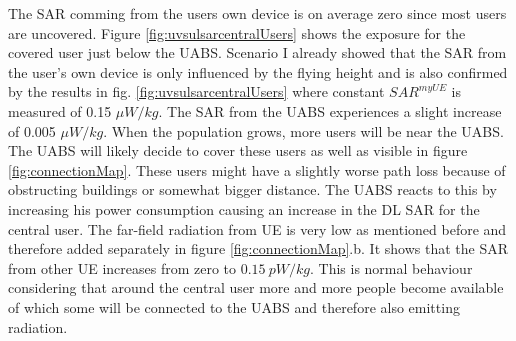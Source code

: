 \documentclass[twocolumn]{phdsymp} %
\begin{document}
The \gls{SAR} comming from the 
users own device is on average zero since most users are uncovered. 
Figure \ref{fig:uvsulsarcentralUsers} shows the exposure for the covered user
just below the \gls{UABS}. Scenario I already showed that the \gls{SAR} from the user's own device is only influenced by the flying height
and is also confirmed by the results in fig. \ref{fig:uvsulsarcentralUsers} where constant $SAR^{myUE}$ is measured of 0.15 $\mu W/kg$.
The \gls{SAR} from the \gls{UABS} experiences a slight increase of 0.005 $\mu W/kg$. When the population grows, more users
will be near the \gls{UABS}. The \gls{UABS} will likely decide to cover these users as well as visible in figure \ref{fig:connectionMap}.
These users might have a slightly 
worse path loss because of obstructing buildings or somewhat bigger distance. The \gls{UABS} reacts to this by increasing 
his power consumption causing an increase in the \gls{DL} \gls{SAR} for the central user.
The far-field radiation from \gls{UE} is very low as mentioned before and therefore added separately in figure \ref{fig:connectionMap}.b.
It shows that the \gls{SAR}  from other \gls{UE} increases from zero to $0.15\ pW/kg$. This is normal 
behaviour considering that around the central user more and more people become available of which some will be connected to the \gls{UABS}
and therefore also emitting radiation.
\end{document}
